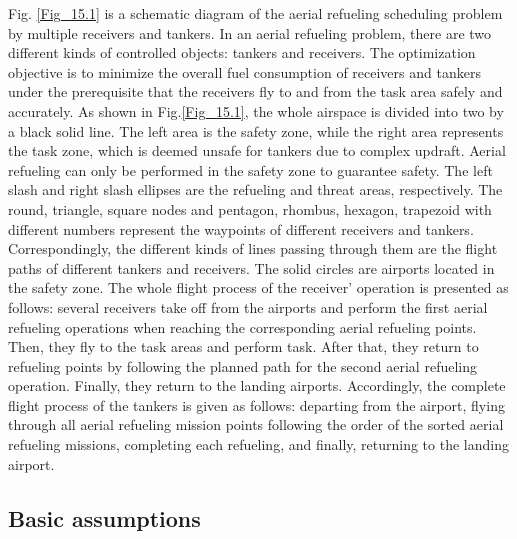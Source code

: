 Fig. \ref{Fig_15.1} is a schematic diagram of the aerial refueling scheduling problem by multiple receivers and tankers. In an aerial refueling problem, there are two different kinds of controlled objects: tankers and receivers. The optimization objective is to minimize the overall fuel consumption of receivers and tankers under the prerequisite that the receivers fly to and from the task area safely and accurately. As shown in Fig.\ref{Fig_15.1}, the whole airspace is divided into two by a black solid line. The left area is the safety zone, while the right area represents the task zone, which is deemed unsafe for tankers due to complex updraft. Aerial refueling can only be performed in the safety zone to guarantee safety. The left slash and right slash ellipses are the refueling and threat areas, respectively. The round, triangle, square nodes and pentagon, rhombus, hexagon, trapezoid with different numbers represent the waypoints of different receivers and tankers. Correspondingly, the different kinds of lines passing through them are the flight paths of different tankers and receivers. The solid circles are airports located in the safety zone. The whole flight process of the receiver'  operation is presented as follows: several receivers take off from the airports and perform the first aerial refueling operations when reaching the corresponding aerial refueling points. Then, they fly to the task areas and perform task. After that, they return to refueling points by following the planned path for the second aerial refueling operation. Finally, they return to the landing airports. Accordingly, the complete flight process of the tankers is given as follows: departing from the airport, flying through all aerial refueling mission points following the order of the sorted aerial refueling missions, completing each refueling, and finally, returning to the landing airport.






















\subsection{Basic assumptions}

